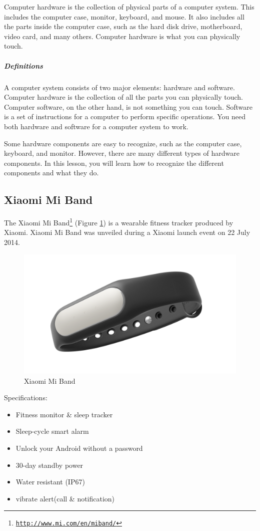 Computer hardware is the collection of physical parts of a computer system. This includes the computer case, monitor, keyboard, and mouse. It also includes all the parts inside the computer case, such as the hard disk drive, motherboard, video card, and many others. Computer hardware is what you can physically touch.
\subparagraph*{Definitions}
\hfill \break
A computer system consists of two major elements: hardware and software. Computer hardware is the collection of all the parts you can physically touch. Computer software, on the other hand, is not something you can touch. Software is a set of instructions for a computer to perform specific operations. You need both hardware and software for a computer system to work.

Some hardware components are easy to recognize, such as the computer case, keyboard, and monitor. However, there are many different types of hardware components. In this lesson, you will learn how to recognize the different components and what they do.
\subsection{Xiaomi Mi Band}

The Xiaomi Mi Band\footnote{\href{http://www.mi.com/en/miband/}{\texttt{http://www.mi.com/en/miband/}}} (Figure \ref{fig:smartband}) is a wearable fitness tracker produced by Xiaomi. Xiaomi Mi Band was unveiled during a Xiaomi launch event on 22 July 2014.
\begin{figure}[h]
	\centering
	\includegraphics[width=0.7\linewidth]{images/smartband}
	\caption{Xiaomi Mi Band}
	\label{fig:smartband}
\end{figure}

Specifications:
\begin{itemize}
	\item Fitness monitor \& sleep tracker
	\item Sleep-cycle smart alarm
	\item Unlock your Android without a password
	\item 30-day standby power
	\item Water resistant (IP67)
	\item vibrate alert(call \& notification)
\end{itemize}

